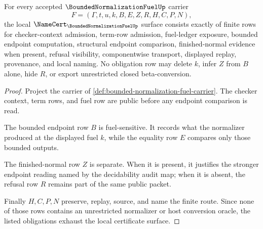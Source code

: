 \begin{theorem}
\label{thm:bounded-normalization-fuel-namecert-obligations}
For every accepted $\BoundedNormalizationFuelUp$ carrier
$$
F=(\Gamma,t,u,k,B,E,Z,R,H,C,P,N),
$$
the local $\NameCert_{\BoundedNormalizationFuelUp}$ surface consists exactly of finite rows for checker-context admission, term-row admission, fuel-ledger exposure, bounded endpoint computation, structural endpoint comparison, finished-normal evidence when present, refusal visibility, componentwise transport, displayed replay, provenance, and local naming. No obligation row may delete $k$, infer $Z$ from $B$ alone, hide $R$, or export unrestricted closed beta-conversion.
\end{theorem}
\begin{proof}
Project the carrier of \autoref{def:bounded-normalization-fuel-carrier}. The checker context, term rows, and fuel row are public before any endpoint comparison is read.

The bounded endpoint row $B$ is fuel-sensitive. It records what the normalizer produced at the displayed fuel $k$, while the equality row $E$ compares only those bounded outputs.

The finished-normal row $Z$ is separate. When it is present, it justifies the stronger endpoint reading named by the decidability audit map; when it is absent, the refusal row $R$ remains part of the same public packet.

Finally $H,C,P,N$ preserve, replay, source, and name the finite route. Since none of those rows contains an unrestricted normalizer or host conversion oracle, the listed obligations exhaust the local certificate surface.
\end{proof}

